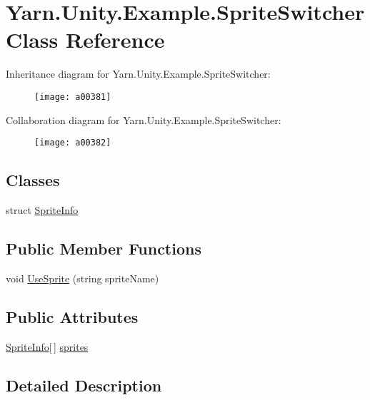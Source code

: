 \hypertarget{a00087}{\section{Yarn.\-Unity.\-Example.\-Sprite\-Switcher Class Reference}
\label{a00087}
}


Inheritance diagram for Yarn.\-Unity.\-Example.\-Sprite\-Switcher\-:
\nopagebreak
\begin{figure}[H]
\begin{center}
\leavevmode
\texttt{[image: a00381]}
\end{center}
\end{figure}


Collaboration diagram for Yarn.\-Unity.\-Example.\-Sprite\-Switcher\-:
\nopagebreak
\begin{figure}[H]
\begin{center}
\leavevmode
\texttt{[image: a00382]}
\end{center}
\end{figure}
\subsection*{Classes}
\begin{DoxyCompactItemize}
\item 
struct \hyperlink{a00087_a00184}{Sprite\-Info}
\end{DoxyCompactItemize}
\subsection*{Public Member Functions}
\begin{DoxyCompactItemize}
\item 
void \hyperlink{a00087_ac26718b713f342f3de8f3e569c5b62da}{Use\-Sprite} (string sprite\-Name)
\end{DoxyCompactItemize}
\subsection*{Public Attributes}
\begin{DoxyCompactItemize}
\item 
\hyperlink{a00087_a00184}{Sprite\-Info}\mbox{[}$\,$\mbox{]} \hyperlink{a00087_a1e85d9f4f6b33ca7ae638cce2eb704aa}{sprites}
\end{DoxyCompactItemize}


\subsection{Detailed Description}


